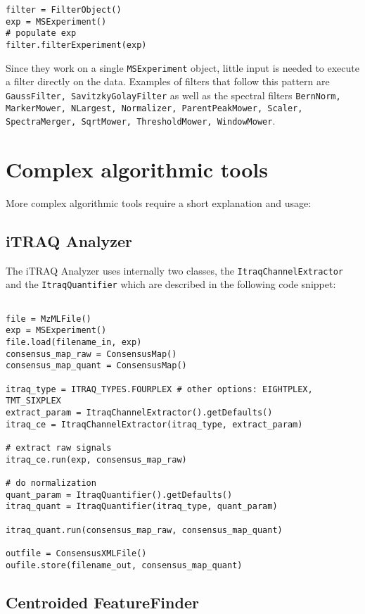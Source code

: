 \documentclass[10pt]{article}
\begin{document}
\begin{verbatim}
filter = FilterObject()
exp = MSExperiment() 
# populate exp
filter.filterExperiment(exp)
\end{verbatim}

Since they work on a single \texttt{MSExperiment} object, little input is needed to
execute a filter directly on the data. Examples of filters that follow this
pattern are \texttt{GaussFilter, SavitzkyGolayFilter} as well as the spectral
filters \texttt{BernNorm, MarkerMower, NLargest, Normalizer, ParentPeakMower,
Scaler, SpectraMerger, SqrtMower, ThresholdMower, WindowMower}.

\section{Complex algorithmic tools}

More complex algorithmic tools require a short explanation and usage:

\subsection{iTRAQ Analyzer}

The iTRAQ Analyzer uses internally two classes, the
\texttt{ItraqChannelExtractor} and the \texttt{ItraqQuantifier} which are
described in the following code snippet:

\begin{verbatim}

file = MzMLFile() 
exp = MSExperiment() 
file.load(filename_in, exp)
consensus_map_raw = ConsensusMap()  
consensus_map_quant = ConsensusMap() 

itraq_type = ITRAQ_TYPES.FOURPLEX # other options: EIGHTPLEX, TMT_SIXPLEX
extract_param = ItraqChannelExtractor().getDefaults()
itraq_ce = ItraqChannelExtractor(itraq_type, extract_param)

# extract raw signals
itraq_ce.run(exp, consensus_map_raw)

# do normalization
quant_param = ItraqQuantifier().getDefaults()
itraq_quant = ItraqQuantifier(itraq_type, quant_param)

itraq_quant.run(consensus_map_raw, consensus_map_quant)

outfile = ConsensusXMLFile()
oufile.store(filename_out, consensus_map_quant)
\end{verbatim}

\subsection{Centroided FeatureFinder}
\end{document}
